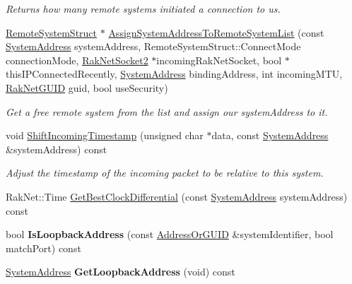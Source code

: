 \begin{DoxyCompactItemize}
\begin{DoxyCompactList}\small\item\em Returns how many remote systems initiated a connection to us. \end{DoxyCompactList}\item 
\hyperlink{struct_rak_net_1_1_rak_peer_1_1_remote_system_struct}{Remote\-System\-Struct} $\ast$ \hyperlink{class_rak_net_1_1_rak_peer_a2da01b7948820f3527590e3fc09869da}{Assign\-System\-Address\-To\-Remote\-System\-List} (const \hyperlink{struct_rak_net_1_1_system_address}{System\-Address} system\-Address, Remote\-System\-Struct\-::\-Connect\-Mode connection\-Mode, \hyperlink{class_rak_net_1_1_rak_net_socket2}{Rak\-Net\-Socket2} $\ast$incoming\-Rak\-Net\-Socket, bool $\ast$this\-I\-P\-Connected\-Recently, \hyperlink{struct_rak_net_1_1_system_address}{System\-Address} binding\-Address, int incoming\-M\-T\-U, \hyperlink{struct_rak_net_1_1_rak_net_g_u_i_d}{Rak\-Net\-G\-U\-I\-D} guid, bool use\-Security)
\begin{DoxyCompactList}\small\item\em Get a free remote system from the list and assign our system\-Address to it. \end{DoxyCompactList}\item 
void \hyperlink{class_rak_net_1_1_rak_peer_a9251492e6d3d0538111c1d90be554b2d}{Shift\-Incoming\-Timestamp} (unsigned char $\ast$data, const \hyperlink{struct_rak_net_1_1_system_address}{System\-Address} \&system\-Address) const 
\begin{DoxyCompactList}\small\item\em Adjust the timestamp of the incoming packet to be relative to this system. \end{DoxyCompactList}\item 
Rak\-Net\-::\-Time \hyperlink{class_rak_net_1_1_rak_peer_a1e23c8101ff1db0f6d6429afb7b1e711}{Get\-Best\-Clock\-Differential} (const \hyperlink{struct_rak_net_1_1_system_address}{System\-Address} system\-Address) const 
\item 
\hypertarget{class_rak_net_1_1_rak_peer_a8dc17e30f977a680b0d41fa9c2585ece}{bool {\bfseries Is\-Loopback\-Address} (const \hyperlink{struct_rak_net_1_1_address_or_g_u_i_d}{Address\-Or\-G\-U\-I\-D} \&system\-Identifier, bool match\-Port) const }\label{class_rak_net_1_1_rak_peer_a8dc17e30f977a680b0d41fa9c2585ece}

\item 
\hypertarget{class_rak_net_1_1_rak_peer_a9a40b088520929d612262d06c56a0376}{\hyperlink{struct_rak_net_1_1_system_address}{System\-Address} {\bfseries Get\-Loopback\-Address} (void) const }\label{class_rak_net_1_1_rak_peer_a9a40b088520929d612262d06c56a0376}


\end{DoxyCompactItemize}
